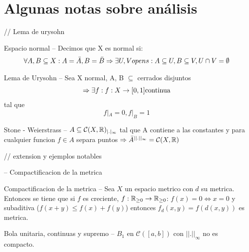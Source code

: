 \section{Algunas notas sobre análisis}

// Lema de urysohn
\begin{Definition}{Espacio normal}
    -- Decimos que X es normal si:
    $$ \forall A, B \subseteq X: A = \bar{A}, B = \bar{B} \Rightarrow \exists U, V opens: A 
    \subseteq U, B \subseteq V, U \cap V = \emptyset $$
\end{Definition}

\begin{Lemma}{Lema de Urysohn}
    -- Sea X normal, A, B $\subseteq$ cerrados disjuntos 
    $$\Rightarrow \exists f : f: X \to [0, 1] \text{continua} $$
    tal que 
    $$ f|_A = 0, f|_B = 1 $$ 
\end{Lemma}


\begin{Theorem}{Stone - Weierstrass}
    -- $A \subseteq \mathcal{C}(X, \mathbb{R})_{|.|_\infty}$
    tal que A contiene a las constantes y para cualquier funcion $f \in A$ separa puntos
    $\Rightarrow \bar{A}^{||.||_\infty} = \mathcal{C}(X, \mathbb{R})$ 
\end{Theorem}

// extension y ejemplos notables

-- Compactificacion de la metrica

\begin{Proposition}{Compactificacion de la metrica}
    -- Sea $X$ un espacio metrico con $d$ su metrica. Entonces 
    se tiene que si $f$ es creciente, $f: \mathbb{R}_{\geq 0} \to \mathbb{R}_{\geq 0} $: $f(x) = 0 \iff x = 0$ y subaditiva ($f(x + y) \leq f(x) + f(y)$)
    entonces $f_d(x, y) = f(d(x, y))$ es metrica. 
\end{Proposition}

\begin{Proposition}{Bola unitaria, continuas y supremo}
    -- $B_1$ en $\mathcal{C}([a, b])$ con $||.||_\infty$ 
    no es compacto.
\end{Proposition}